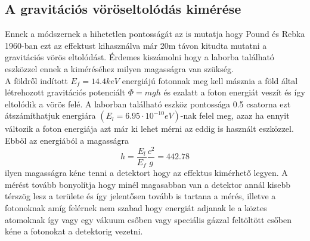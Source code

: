 \documentclass[a4paper,12pt]{article}
\numberwithin{equation}{subsection}
\begin{document}
\subsection{A gravitációs vöröseltolódás kimérése}
Ennek a módszernek a hihetetlen pontosságát az is mutatja hogy Pound és Rebka 1960-ban ezt az effektust kihasználva már 20m távon kitudta mutatni a gravitációs vörös eltolódást. Érdemes kiszámolni hogy a laborba található eszközzel ennek a kiméréséhez milyen magasságra van szükség. \\A földről indított $E_f=14.4keV$ energiájú fotonnak meg kell másznia a föld által létrehozott gravitációs potenciált $\Phi=mgh$ és ezalatt a foton energiát veszít és így eltolódik a vörös felé. A laborban található eszköz pontossága 0.5 csatorna ezt átszámíthatjuk energiára $(E_l=6.95\cdot10^{-10}eV)$-nak felel meg, azaz ha ennyit változik a foton energiája azt már ki lehet mérni az eddig is használt eszközzel. Ebből az energiából a magasságra \[h=\frac{E_l}{E_f}\frac{c^2}{g}=442.78\] ilyen magasságra kéne tenni a detektort hogy az effektus kimérhető legyen. A mérést tovább bonyolítja hogy minél magasabban van a detektor annál kisebb térszög lesz a területe és így jelentősen tovább is tartana a mérés, illetve a fotonoknak amíg felérnek nem szabad hogy energiát adjanak le a köztes atomoknak így vagy egy vákuum csőben vagy speciális gázzal feltöltött csőben kéne a fotonokat a detektorig vezetni.
\end{document}
